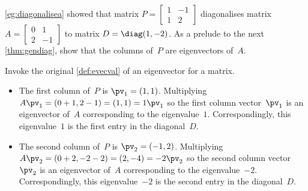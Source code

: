 \begin{example} \label{eg:}
\autoref{eg:diagonalisea} showed that matrix \(P=\begin{bmatrix} 1&-1\\1&2 \end{bmatrix}\) diagonalises matrix \(A=\begin{bmatrix} 0&1\\2&-1 \end{bmatrix}\) to matrix \(D=\diag(1,-2)\). 
As a prelude to the next \autoref{thm:gendiag}, show that the columns of~\(P\) are eigenvectors of~\(A\).
\begin{solution} Invoke the original \autoref{def:evecval} of an eigenvector for a matrix.
\begin{itemize}
\item The first column of~\(P\) is \(\pv_1=(1,1)\).
Multiplying \(A\pv_1=(0+1,2-1)=(1,1)=1\pv_1\) so the first column vector~\(\pv_1\) is an eigenvector of~\(A\) corresponding to the eigenvalue~\(1\).
Correspondingly, this eigenvalue~\(1\) is the first entry in the diagonal~\(D\).

\item The second column of~\(P\) is \(\pv_2=(-1,2)\).
Multiplying \(A\pv_2=(0+2,-2-2)=(2,-4)=-2\pv_2\) so the second column vector~\(\pv_2\) is an eigenvector of~\(A\) corresponding to the eigenvalue~\(-2\).
Correspondingly, this eigenvalue~\(-2\) is the second entry in the diagonal~\(D\).
\end{itemize}
\end{solution}
\end{example}




